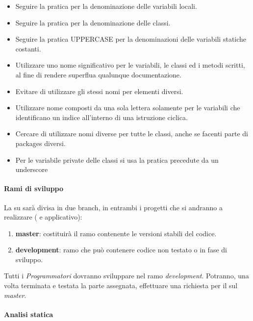 \begin{itemize}
\item Seguire la pratica  per la denominazione delle variabili locali.
\item Seguire la pratica  per la denominazione delle classi.
\item Seguire la pratica UPPER\textunderscore CASE per la denominazioni delle variabili statiche costanti.
\item Utilizzare uno nome significativo per le variabili, le classi ed i metodi scritti, al fine di rendere superflua qualunque documentazione.
\item Evitare di utilizzare gli stessi nomi per elementi diversi.
\item Utilizzare nome composti da una sola lettera solamente per le variabili che identificano un indice all'interno di una istruzione ciclica.
\item Cercare di utilizzare nomi diverse per tutte le classi, anche se facenti parte di packages diversi.
\item Per le variabile private delle classi si usa la pratica  precedute da un underscore 
\end{itemize}

\paragraph{Rami di sviluppo}

La  su  sarà divisa in due branch, in entrambi i progetti che si andranno a realizzare ( e applicativo):
\begin{enumerate}
\item \textbf{master}: costituirà il ramo contenente le versioni stabili del codice.
\item \textbf{development}: ramo che può contenere codice non testato o in fase di sviluppo.
\end{enumerate}


Tutti i \textit{Programmatori} dovranno sviluppare nel ramo \textit{development}. Potranno, una volta terminata e testata la parte assegnata, effettuare una richiesta per il  sul \textit{master}.

\paragraph{Analisi statica}

